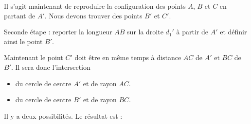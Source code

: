 Il s'agit maintenant de reproduire la configuration des points \( A\), \( B\) et \( C\) en partant de \( A'\). Nous devons trouver des points \( B'\) et \( C'\).

Seconde étape : reporter la longueur \( AB\) sur la droite \( d_1'\) à partir de \( A'\) et définir ainsi le point \( B'\).

\begin{center}
   
\end{center}

Maintenant le point \( C'\) doit être en même temps à distance \( AC\) de \( A'\) et \( BC\) de \( B'\). Il sera donc l'intersection
\begin{itemize}
    \item 
        du cercle de centre \( A'\) et de rayon \( AC\).
    \item
        du cercle de centre \( B'\) et de rayon \( BC\).
\end{itemize}

\begin{center}
   
\end{center}

Il y a deux possibilités. Le résultat est :
\begin{center}
   
\end{center}


